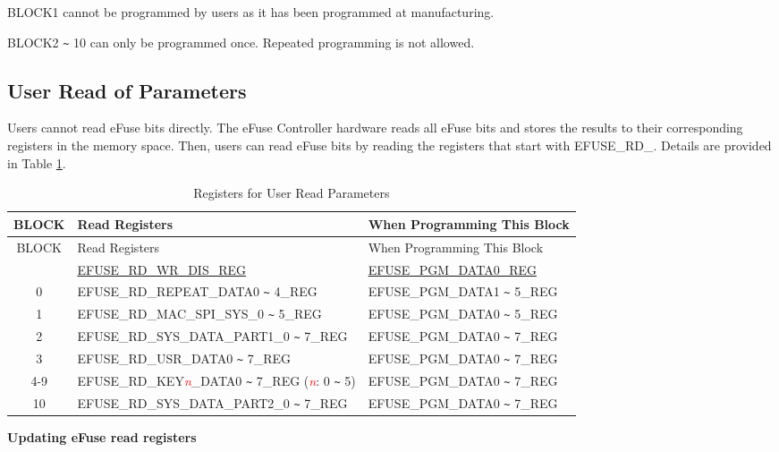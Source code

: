 \documentclass[main\_\_EN.tex]{subfiles}
\begin{document}
BLOCK1 cannot be programmed by users as it has been programmed at manufacturing.

BLOCK2 \verb+~+ 10 can only be programmed once. Repeated programming is not allowed.




\subsection{User Read of Parameters}\label{softwarereadparameters}

Users cannot read eFuse bits directly. The eFuse Controller hardware reads all eFuse bits and stores the results to their corresponding registers in the memory space. Then, users can read eFuse bits by reading the registers that start with EFUSE\_RD\_. Details are provided in Table \ref{fig:efuse-read-register}.

\begin{longtable}[c]{|c|l|l|}
    \caption{Registers for User Read Parameters} \label{fig:efuse-read-register}
    \\\hline
    \rowcolor{lightgray}
  BLOCK & Read Registers & When Programming This Block\\
    \endfirsthead
    \hline
    \rowcolor{lightgray}
  BLOCK & Read Registers & When Programming This Block\\
    \endhead
    \endfoot
    \endlastfoot
    \hline
0  & \hyperref[regdesc:EFUSERDWRDISREG]{EFUSE\_RD\_WR\_DIS\_REG} & \hyperref[regdesc:EFUSEPGMDATANREG]{EFUSE\_PGM\_DATA0\_REG} \\\hline
0  & EFUSE\_RD\_REPEAT\_DATA0 \verb+~+ 4\_REG & EFUSE\_PGM\_DATA1 \verb+~+ 5\_REG \\\hline
1  & EFUSE\_RD\_MAC\_SPI\_SYS\_0 \verb+~+ 5\_REG & EFUSE\_PGM\_DATA0 \verb+~+ 5\_REG \\\hline
2  & EFUSE\_RD\_SYS\_DATA\_PART1\_0 \verb+~+ 7\_REG & EFUSE\_PGM\_DATA0 \verb+~+ 7\_REG \\\hline
3  & EFUSE\_RD\_USR\_DATA0 \verb+~+ 7\_REG & EFUSE\_PGM\_DATA0 \verb+~+ 7\_REG \\ \hline
4-9 & EFUSE\_RD\_KEY\textcolor{red}{\it{n}}\_DATA0 \verb+~+ 7\_REG (\textcolor{red}{\it{n}}: 0 \verb+~+ 5) & EFUSE\_PGM\_DATA0 \verb+~+ 7\_REG \\\hline
10 & EFUSE\_RD\_SYS\_DATA\_PART2\_0 \verb+~+ 7\_REG & EFUSE\_PGM\_DATA0 \verb+~+ 7\_REG \\\hline
\end{longtable}

{\bfseries Updating eFuse read registers}\label{updatingRDregister}
\end{document}
